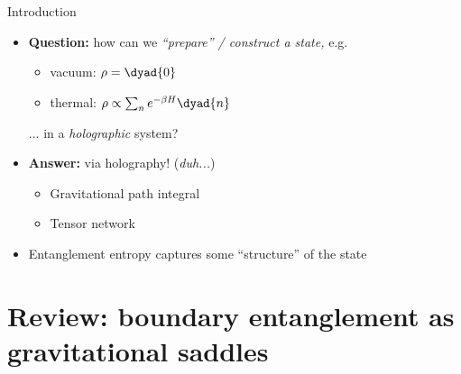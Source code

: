 \documentclass[aspectratio=169,10pt
	,noamsthm
]{beamer}
\begin{document}
\begin{frame}{Introduction}
\begin{itemize}
\item \textbf{Question:} how can we \textit{``prepare'' / construct a state,} e.g.
	\begin{itemize}
	\item vacuum: $\rho = \dyad{0}$
	\item thermal: $\rho \propto \sum_n e^{-\beta H} \dyad{n}$
	\end{itemize}
	... in a \textit{holographic} system? \\
\pause
\item \textbf{Answer:} via holography! (\textit{duh...})
	\begin{itemize}
	\item Gravitational path integral\pause
	\item Tensor network
	\end{itemize}\pause
\item Entanglement entropy captures some ``structure'' of the state
\end{itemize}
\end{frame}


\section{Review: boundary entanglement as gravitational saddles}
\end{document}
